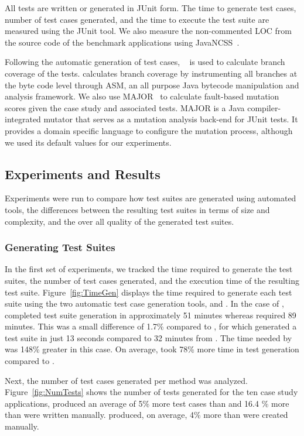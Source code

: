 All tests are written or generated in JUnit form.  The time to generate test cases, number of test cases generated, and the time to execute the test suite are measured using the JUnit tool.  We also measure the non-commented LOC from the source code of the benchmark applications using JavaNCSS~\cite{leejavancss}.  

Following the automatic generation of test cases, \jacoco~\cite{jacoco} is used to calculate branch coverage of the tests.  \jacoco calculates branch coverage by instrumenting all branches at the byte code level through ASM, an all purpose Java bytecode manipulation and analysis framework. We also use MAJOR~\cite{just2011} to calculate fault-based mutation scores given the case study and associated tests. MAJOR is a Java compiler-integrated mutator that serves as a mutation analysis back-end for JUnit tests.  It provides a domain specific language to configure the mutation process, although we used its default values for our experiments.

\subsection{Experiments and Results}
Experiments were run to compare how test suites are generated using automated tools, the differences between the resulting test suites in terms of size and complexity, and the over all quality of the generated test suites.  

\subsubsection{Generating Test Suites }
In the first set of experiments, we tracked the time required to generate the test suites, the number of test cases generated, and the execution time of the resulting test suite.  Figure~\ref{fig:TimeGen} displays the time required to generate each test suite using the two automatic test case generation tools, \codepro and \evo.  In the case of \netweaver, \codepro completed test suite generation in approximately 51 minutes whereas \evo required 89 minutes.  This was a small difference of 1.7\% compared to \xisemele, for which \codepro generated a test suite in just 13 seconds compared to 32 minutes from \evo.  The time needed by \evo was 148\% greater in this case.  On average, \evo took 78\% more time in test generation compared to \codepro.

Next, the number of test cases generated per method was analyzed.  Figure~\ref{fig:NumTests} shows the number of tests generated for the ten case study applications, \codepro produced an average of  5\% more test cases than \evo and 16.4 \% more than were written manually.  \evo produced, on average, 4\% more than were created manually. 

